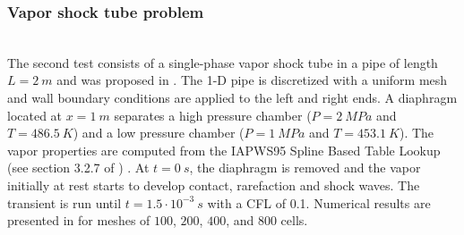 \documentclass{inputs/mc2015}
\begin{document}
\subsubsection{Vapor shock tube problem} \label{sec:vap-1-phase-shock-tube}
%
 \\
The second test consists of a single-phase vapor shock tube in a pipe of length $L=2 \ m$ and was proposed in \cite{waha-manual, Sokolowski-Koszela}. The 1-D pipe is discretized with a uniform mesh and wall boundary conditions are applied to the left and right ends. A diaphragm located at $x=1 \ m$ separates a high pressure chamber ($P=2 \ MPa$ and $T=486.5 \ K$) and a low pressure chamber ($P=1 \ MPa$ and $T=453.1 \ K$). The vapor properties are computed from the IAPWS95 Spline Based Table Lookup (see section 3.2.7 of \cite{relap7-manual}) . At $t=0 \ s$, the diaphragm is removed and the vapor initially at rest starts to develop contact, rarefaction and shock waves. The transient is run until $t=1.5 \cdot 10^{-3} \ s$ with a CFL of 0.1. Numerical results are presented in  for meshes of $100$, $200$, $400$, and $800$ cells.
%
\end{document}
